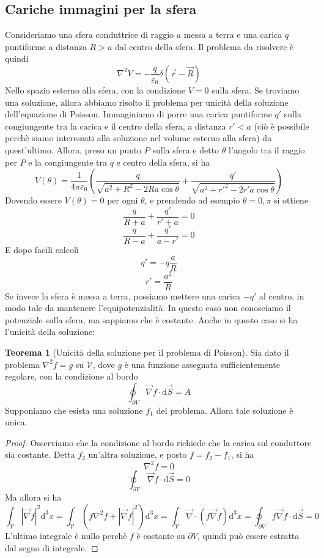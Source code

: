 \documentclass[a4paper,11pt]{book}
\let\oldnabla\nabla
\renewcommand{\nabla}{\vec{\oldnabla}}
\newcommand{\dif}{\mathrm{d}}
\newcommand{\lap}{\oldnabla^2}
\let\oldepsilon\epsilon
\let\oldvarepsilon\varepsilon
\renewcommand{\epsilon}{\oldvarepsilon}
\renewcommand{\varepsilon}{\oldepsilon}
\newcommand{\V}{\mathcal{V}}
\theoremstyle{definition}
\theoremstyle{theorem}
\newtheorem{teorema}{Teorema}[section]
\begin{document}
\subsection{Cariche immagini per la sfera}
Consideriamo una sfera conduttrice di raggio $a$ messa a terra e una carica $q$ puntiforme a distanza $R>a$ dal centro della sfera. Il problema da risolvere è quindi
\[\lap V=-\frac{q}{\epsilon_0}\delta(\vec{r}-\vec{R})\]
Nello spazio esterno alla sfera, con la condizione $V=0$ sulla sfera. Se troviamo una soluzione, allora abbiamo risolto il problema per unicità della soluzione dell'equazione di Poisson. Immaginiamo di porre una carica puntiforme $q'$ sulla congiungente tra la carica e il centro della sfera, a distanza $r'<a$ (ciò è possibile perchè siamo interessati alla soluzione nel volume esterno alla sfera) da quest'ultimo. Allora, preso un punto $P$ sulla sfera e detto $\theta$ l'angolo tra il raggio per $P$ e la congiungente tra $q$ e centro della sfera, si ha
\[V(\theta)=\frac{1}{4\pi\epsilon_0}\left(\frac{q}{\sqrt{a^2+R^2-2Ra\cos\theta}}+\frac{q'}{\sqrt{a^2+r'^2-2r'a\cos\theta}}\right)\]
Dovendo essere $V(\theta)=0$ per ogni $\theta$, e prendendo ad esempio $\theta=0,\pi$ si ottiene
\[\frac{q}{R+a}+\frac{q'}{r'+a}=0\]
\[\frac{q}{R-a}+\frac{q'}{a-r'}=0\]
E dopo facili calcoli
\[q'=-q\frac{a}{R}\]
\[r'=\frac{a^2}{R}\]
Se invece la sfera è messa a terra, possiamo mettere una carica $-q'$ al centro, in modo tale da mantenere l'equipotenzialità. In questo caso non conosciamo il potenziale sulla sfera, ma sappiamo che è costante. Anche in questo caso si ha l'unicità della soluzione:
\begin{teorema}[Unicità della soluzione per il problema di Poisson]
	Sia dato il problema $\lap f=g$ su $\mathcal{V}$, dove $g$ è una funzione assegnata sufficientemente regolare, con la condizione al bordo
	\[\oint_{\partial V}\nabla f\cdot\dif\vec{S}=A\]
	Supponiamo che esista una soluzione $f_1$ del problema. Allora tale soluzione è unica.
\end{teorema}
\begin{proof}
	Osserviamo che la condizione al bordo richiede che la carica sul conduttore sia costante. Detta $f_2$ un'altra soluzione, e posto $f=f_2-f_1$, si ha
	\[\lap f=0\]
	\[\oint_{\partial \V}\nabla f\cdot\dif\vec{S}=0\]
	Ma allora si ha
	\[\int_{\V}|\nabla f|^2\dif^3x=\int_{\V}\left(f\lap f+|\nabla f|^2\right)\dif^3x=\int_{\V}\nabla\cdot\left(f\nabla f\right)\dif^3x=\oint_{\partial V}f\nabla f\cdot\dif\vec{S}=0\]
	L'ultimo integrale è nullo perchè $f$ è costante su $\partial V$, quindi può essere estratta dal segno di integrale.
\end{proof}
\end{document}
